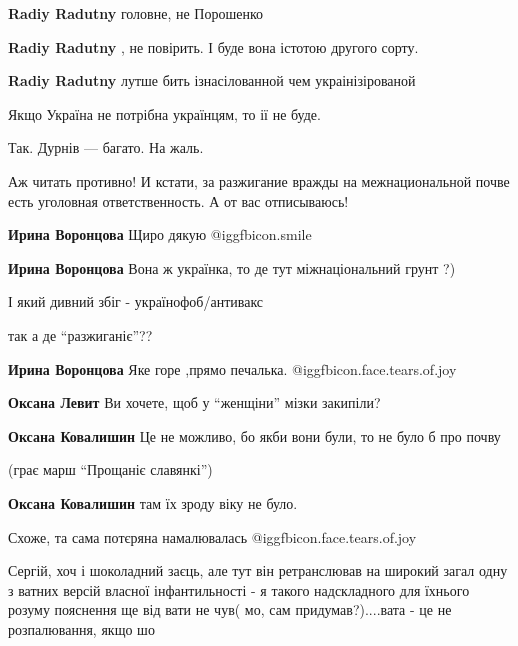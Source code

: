 \begin{itemize}
\begin{itemize}
\textbf{Radiy Radutny} головне, не Порошенко

\textbf{Radiy Radutny} , не повірить. І буде вона істотою другого сорту.

\textbf{Radiy Radutny} лутше бить ізнасілованной чем украінізірованой
\end{itemize} %

Якщо Україна не потрібна українцям, то ії не буде.

Так. Дурнів — багато. На жаль.


Аж читать противно! И кстати, за разжигание вражды на межнациональной почве
есть уголовная ответственность. А от вас отписываюсь!

\begin{itemize} %
\textbf{Ирина Воронцова} Щиро дякую  @igg{fbicon.smile} 

\textbf{Ирина Воронцова} Вона ж українка, то де тут міжнаціональний грунт ?)

І який дивний збіг - українофоб/антивакс

так а де \enquote{разжиганіє}??

\textbf{Ирина Воронцова} Яке горе ,прямо печалька. @igg{fbicon.face.tears.of.joy} 

\textbf{Оксана Левит} Ви хочете, щоб у \enquote{женщіни} мізки закипіли?

\textbf{Оксана Ковалишин} Це не можливо, бо якби вони були, то не було б про почву

(грає марш \enquote{Прощаніє славянкі})

\textbf{Оксана Ковалишин} там їх зроду віку не було.

Схоже, та сама потєряна намалювалась  @igg{fbicon.face.tears.of.joy} 


Сергій, хоч і шоколадний заєць, але тут він ретранслював на широкий загал одну
з ватних версій власної інфантильності - я такого надскладного для їхнього
розуму пояснення ще від вати не чув( мо, сам придумав?)....вата - це не
розпалювання, якщо шо

\end{itemize} %


\end{itemize}
